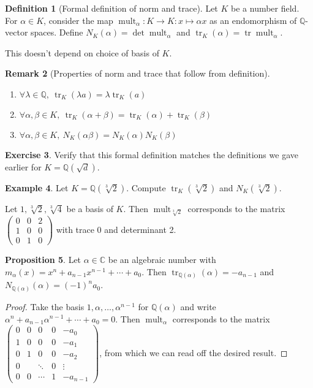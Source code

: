 \documentclass{article}
\newcommand{\Q}{\mathbb{Q}}
\newcommand{\C}{\mathbb{C}}
\newcommand{\tr}{\operatorname{tr}}
\newcommand{\mult}{\operatorname{mult}}
\theoremstyle{definition}
\newtheorem{defn}{Definition}[subsection]
\newtheorem{prop}[defn]{Proposition}
\newtheorem{example}[defn]{Example}
\newtheorem{exe}[defn]{Exercise}
\newtheorem{remark}[defn]{Remark}
\begin{document}
\begin{defn}[Formal definition of norm and trace]
Let $K$ be a number field. For $\alpha\in K$, consider the map $\mult_\alpha:K\rightarrow K:x\mapsto\alpha x$ as an endomorphism of $\Q$-vector spaces. Define $N_K(\alpha)=\det\mult_\alpha$ and $\tr_K(\alpha)=\tr\mult_\alpha$.

This doesn't depend on choice of basis of $K$.
\end{defn}

\begin{remark}[Properties of norm and trace that follow from definition]
\begin{enumerate}
\item $\forall\lambda\in\Q,\ \tr_K(\lambda a)=\lambda\tr_K(a)$
\item $\forall\alpha,\beta\in K,\ \tr_K(\alpha+\beta)=\tr_K(\alpha)+\tr_K(\beta)$
\item $\forall\alpha,\beta\in K,\ N_K(\alpha\beta)=N_K(\alpha)N_K(\beta)$
\end{enumerate}
\end{remark}

\begin{exe}
Verify that this formal definition matches the definitions we gave earlier for $K=\Q\left(\sqrt d\right)$.
\end{exe}

\begin{example}
Let $K=\Q\left(\sqrt[3]2\right)$. Compute $\tr_K\left(\sqrt[3]2\right)$ and $N_K\left(\sqrt[3]2\right)$.

Let $1,\sqrt[3]2,\sqrt[3]4$ be a basis of $K$. Then $\mult_{\sqrt[3]2}$ corresponds to the matrix $\begin{pmatrix}
0 & 0 & 2\\
1 & 0 & 0\\
0 & 1 & 0
\end{pmatrix}$ with trace 0 and determinant 2.
\end{example}

\begin{prop}
Let $\alpha\in\C$ be an algebraic number with $m_\alpha(x)=x^n+a_{n-1}x^{n-1}+\cdots+a_0$. Then $\tr_{\Q(\alpha)}(\alpha)=-a_{n-1}$ and $N_{\Q(\alpha)}(\alpha)=(-1)^na_0$.
\end{prop}
\begin{proof}
Take the basis $1,\alpha,\ldots,\alpha^{n-1}$ for $\Q(\alpha)$ and write $\alpha^n+a_{n-1}\alpha^{n-1}+\cdots+a_0=0$. Then $\mult_\alpha$ corresponds to the matrix $\begin{pmatrix}
0 & 0 & 0 & 0 & -a_0 \\
1 & 0 & 0 & 0 & -a_1\\
0 & 1 & 0 & 0 & -a_2\\
0 & & \ddots & 0 & \vdots \\
0 & 0 & \cdots & 1 & -a_{n-1}
\end{pmatrix}$, from which we can read off the desired result.
\end{proof}
\end{document}
